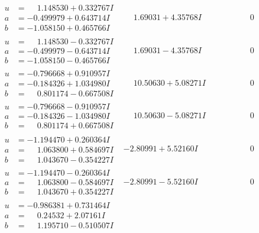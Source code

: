 \documentclass[1p]{elsarticle_modified}
\theoremstyle{definition}
\begin{document}
$$\begin{array}{c|c|c}
\begin{aligned}
u &= \phantom{-}1.148530 + 0.332767 I \\
a &= -0.499979 + 0.643714 I \\
b &= -1.058150 + 0.465766 I\end{aligned}
 & \phantom{-}1.69031 + 4.35768 I & \phantom{-0.000000 } 0 \\ \hline\begin{aligned}
u &= \phantom{-}1.148530 - 0.332767 I \\
a &= -0.499979 - 0.643714 I \\
b &= -1.058150 - 0.465766 I\end{aligned}
 & \phantom{-}1.69031 - 4.35768 I & \phantom{-0.000000 } 0 \\ \hline\begin{aligned}
u &= -0.796668 + 0.910957 I \\
a &= -0.184326 + 1.034980 I \\
b &= \phantom{-}0.801174 - 0.667508 I\end{aligned}
 & \phantom{-}10.50630 + 5.08271 I & \phantom{-0.000000 } 0 \\ \hline\begin{aligned}
u &= -0.796668 - 0.910957 I \\
a &= -0.184326 - 1.034980 I \\
b &= \phantom{-}0.801174 + 0.667508 I\end{aligned}
 & \phantom{-}10.50630 - 5.08271 I & \phantom{-0.000000 } 0 \\ \hline\begin{aligned}
u &= -1.194470 + 0.260364 I \\
a &= \phantom{-}1.063800 + 0.584697 I \\
b &= \phantom{-}1.043670 - 0.354227 I\end{aligned}
 & -2.80991 + 5.52160 I & \phantom{-0.000000 } 0 \\ \hline\begin{aligned}
u &= -1.194470 - 0.260364 I \\
a &= \phantom{-}1.063800 - 0.584697 I \\
b &= \phantom{-}1.043670 + 0.354227 I\end{aligned}
 & -2.80991 - 5.52160 I & \phantom{-0.000000 } 0 \\ \hline\begin{aligned}
u &= -0.986381 + 0.731464 I \\
a &= \phantom{-}0.24532 + 2.07161 I \\
b &= \phantom{-}1.195710 - 0.510507 I\end{aligned}

\end{array}$$
\end{document}
